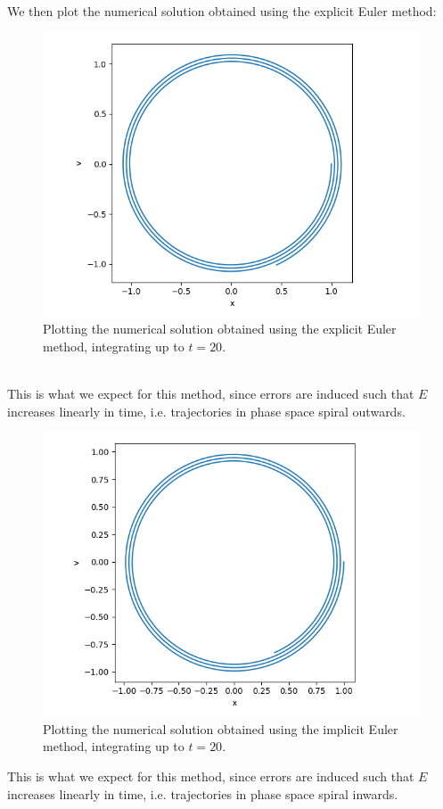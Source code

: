 \documentclass[11pt]{article}
\begin{document}
We then plot the numerical solution obtained using the explicit Euler method:
\begin{figure}[htp]
\centering
\includegraphics[scale=0.80]{euler_phase_space_1_0_0-01_20.png}
\caption{Plotting the numerical solution obtained using the explicit Euler method, integrating up to $t=20$.}
\label{eulphase}
\end{figure}
\\
This is what we expect for this method, since errors are induced such that $E$ increases linearly in time, i.e. trajectories in phase space spiral outwards.
\newpage

\begin{figure}[htp]
\centering
\includegraphics[scale=0.80]{implicit_euler_phase_space_1_0_0-01_20.png}
\caption{Plotting the numerical solution obtained using the implicit Euler method, integrating up to $t=20$.}
\label{impphase}
\end{figure}
This is what we expect for this method, since errors are induced such that $E$ increases linearly in time, i.e. trajectories in phase space spiral inwards.
\end{document}
